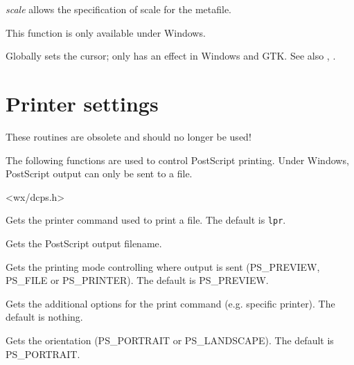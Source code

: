 {\it scale} allows the specification of scale for the metafile.

This function is only available under Windows.

\label{wxsetcursor}


Globally sets the cursor; only has an effect in Windows and GTK.
See also , .

\section{Printer settings}\label{printersettings}

These routines are obsolete and should no longer be used!

The following functions are used to control PostScript printing. Under
Windows, PostScript output can only be sent to a file.


<wx/dcps.h>



Gets the printer command used to print a file. The default is {\tt lpr}.



Gets the PostScript output filename.



Gets the printing mode controlling where output is sent (PS\_PREVIEW, PS\_FILE or PS\_PRINTER).
The default is PS\_PREVIEW.



Gets the additional options for the print command (e.g. specific printer). The default is nothing.



Gets the orientation (PS\_PORTRAIT or PS\_LANDSCAPE). The default is PS\_PORTRAIT.

